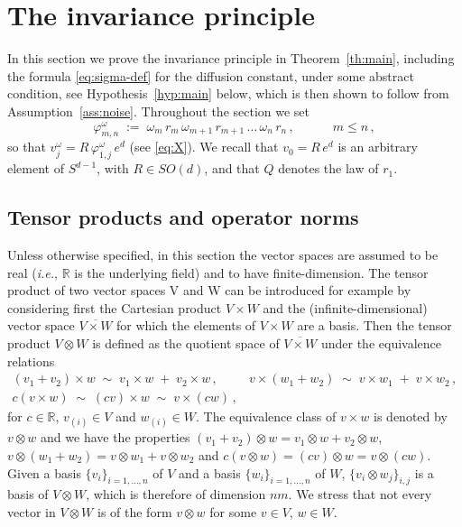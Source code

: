 \documentclass[a4paper,reqno,11pt]{amsart}
\numberwithin{equation}{section}
\newcommand{\gp}{\varphi}
\newcommand{\go}{\omega}
\newcommand{\R}{\mathbb{R}}
\begin{document}
\section{The invariance principle}

\label{sec:preparation}

In this section we prove the invariance principle
in Theorem~\ref{th:main}, including the formula \eqref{eq:sigma-def}
for the diffusion constant, under some abstract condition,
see Hypothesis~\ref{hyp:main} below,
which is then shown to follow from Assumption~\ref{ass:noise}.
Throughout the section we set
\begin{equation} \label{eq:phi}
	\gp_{m,n}^\go \;:=\; \go_m \, r_m \, 	\go_{m+1} \, r_{m+1} \,
	\ldots \, \go_n \, r_n \,, \qquad \quad m \le n \,,
\end{equation}
so that $v_j^\go = R\, \gp_{1,j}^\go \, e^d$ (see \eqref{eq:X}).
We recall that $v_0 = R\,e^d$ is an arbitrary element of $S^{d-1}$,
with $R \in SO(d)$, and that $Q$ denotes the law of $r_1$.


\smallskip

\subsection{Tensor products and operator norms}
\label{sec:tensors}

Unless otherwise specified, in this section the vector spaces
are assumed to be real ({\sl i.e.}, $\R$ is the underlying field)
and to have finite-dimension.
The tensor product  of two vector spaces V and W can be introduced for example
by considering first
the Cartesian product $V\times W$ and the (infinite-dimensional) vector space
$\overline {V\times W}$ for which
the elements of $V\times W$ are a basis. Then the tensor product
$V\otimes W$ is defined as the quotient space of $\overline {V\times W}$ under the
equivalence relations
\begin{gather*}
(v_1+v_2)\times w \;\sim\; v_1\times w \;+\; v_2\times w \,, \qquad \ \
v\times (w_1+w_2) \;\sim\; v\times w_1 \;+\; v\times w_2 \,, \\
c (v\times w) \;\sim\;  (cv)\times w \;\sim\; v \times (cw)\,,
\end{gather*}
for $c\in \R$, $v_{(i)}\in V$ and $w_{(i)}\in W$.
The equivalence class of $v\times w$ is denoted by $v\otimes w$
and we have the properties
$(v_1+v_2) \otimes w= v_1\otimes w+ v_2\otimes w$,
$v\otimes (w_1+w_2)= v\otimes w_1+ v\otimes w_2$
and $c (v\otimes w)= (cv)\otimes w= v\otimes (cw)$.
Given a basis $\{v_i\}_{i=1, \ldots , n}$ of $V$
and a basis $\{w_i\}_{i=1, \ldots , n}$ of $W$, $\{ v_i \otimes w_j\}_{i,j}$
is a basis of $V\otimes W$, which is therefore of dimension $nm$.
We stress that not every vector in $V \otimes W$ is of the form
$v \otimes w$ for some $v \in V$, $w \in W$.
\end{document}
